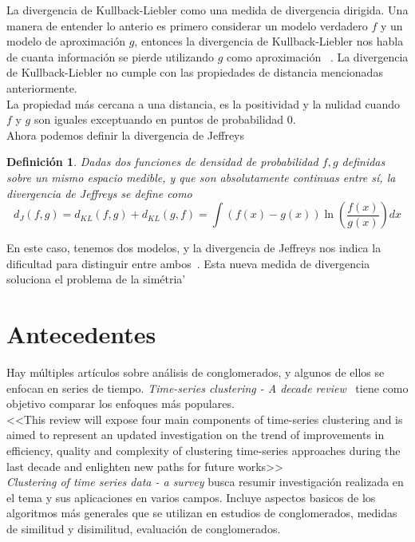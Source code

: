 \documentclass[12pt,oneside]{book}
\newtheorem*{defn}{Definici\'on}
\begin{document}
La divergencia de Kullback-Liebler como una medida de divergencia dirigida. Una manera de entender lo anterio es primero considerar un modelo verdadero $f$ y un modelo de aproximaci\'on $g$, entonces la divergencia de Kullback-Liebler nos habla de cuanta informaci\'on se pierde utilizando $g$ como aproximaci\'on ~\cite{KULLBACK}. La divergencia de Kullback-Liebler no cumple con las propiedades de distancia mencionadas anteriormente.\\

La propiedad m\'as cercana a una distancia, es la positividad y la nulidad cuando $f$ y $g$ son iguales exceptuando en puntos de probabilidad $0$.\\

Ahora podemos definir la divergencia de Jeffreys
\begin{defn}\normalfont
	Dadas dos funciones de densidad de probabilidad $f, g$ definidas sobre un mismo espacio medible, y que son absolutamente continuas entre s\'i, la divergencia de Jeffreys se define como
	$$
		d_{J}(f, g) = d_{KL}(f, g) +d_{KL}(g, f) = \int (f(x)-g(x)) \ln{\left(\frac{f(x)}{g(x)}\right)}dx
	$$
\end{defn}
En este caso, tenemos dos modelos, y la divergencia de Jeffreys nos indica la dificultad para distinguir entre ambos~\cite{KULLBACK_2}. Esta nueva medida de divergencia soluciona el problema de la sim\'etria'
\section{Antecedentes} %
\label{sec:antecedentes}
Hay m\'ultiples art\'iculos sobre an\'alisis de conglomerados, y algunos de ellos se enfocan en series de tiempo. \textit{Time-series clustering - A decade review}~\cite{TIME_SERIES_CLUSTERING} tiene como objetivo comparar los enfoques m\'as populares.\\
<<This review will expose four main components of time-series clustering and is aimed to represent an updated investigation on the trend of improvements in efficiency, quality and complexity of clustering time-series approaches during the last decade and enlighten new paths for future works>>~\cite{TIME_SERIES_CLUSTERING}\\

\textit{Clustering of time series data - a survey} busca resumir investigaci\'on realizada en el tema y sus aplicaciones en varios campos. Incluye aspectos basicos de los algoritmos m\'as generales que se utilizan en estudios de conglomerados, medidas de similitud y disimilitud, evaluaci\'on de conglomerados.~\cite{TIME_SERIES_CLUSTERING_3}\\
\end{document}
